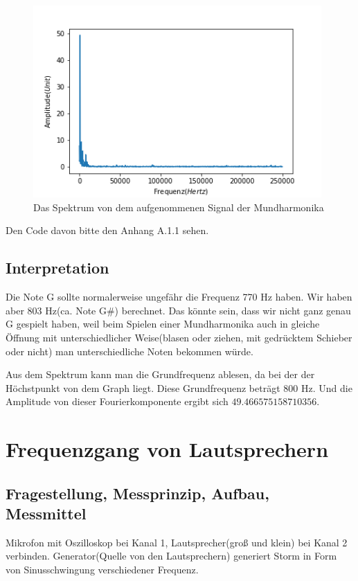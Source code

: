 \documentclass[12pt, oneside, a4paper, \docLanguage]{report}
\begin{document}
\begin{figure}[H]
	\centering\small
	\includegraphics[width=11cm]{Spektrum.png}
	\caption{Das Spektrum von dem aufgenommenen Signal der Mundharmonika}
\end{figure}

Den Code davon bitte den Anhang A.1.1 sehen.

\section{Interpretation}
\label{chap:VERSUCH_1_INTERPRETATION}
Die Note G sollte normalerweise ungefähr die Frequenz 770 Hz haben. Wir haben aber 803 Hz(ca. Note G\#) berechnet. Das könnte sein, dass wir nicht ganz genau G gespielt haben, weil beim Spielen einer Mundharmonika auch in gleiche Öffnung mit unterschiedlicher Weise(blasen oder ziehen, mit gedrücktem Schieber oder nicht) man unterschiedliche Noten bekommen würde.

Aus dem Spektrum kann man die Grundfrequenz ablesen, da bei der der Höchstpunkt von dem Graph liegt. Diese Grundfrequenz beträgt 800 Hz. Und die Amplitude von dieser Fourierkomponente ergibt sich $49.466575158710356$.

%
%
\chapter{Frequenzgang von Lautsprechern}
\section{Fragestellung, Messprinzip, Aufbau, Messmittel}
\qquad Mikrofon mit Oszilloskop bei Kanal 1, Lautsprecher(groß und klein) bei Kanal 2 verbinden.
Generator(Quelle von den Lautsprechern) generiert Storm in Form von Sinusschwingung verschiedener Frequenz.
\end{document}
